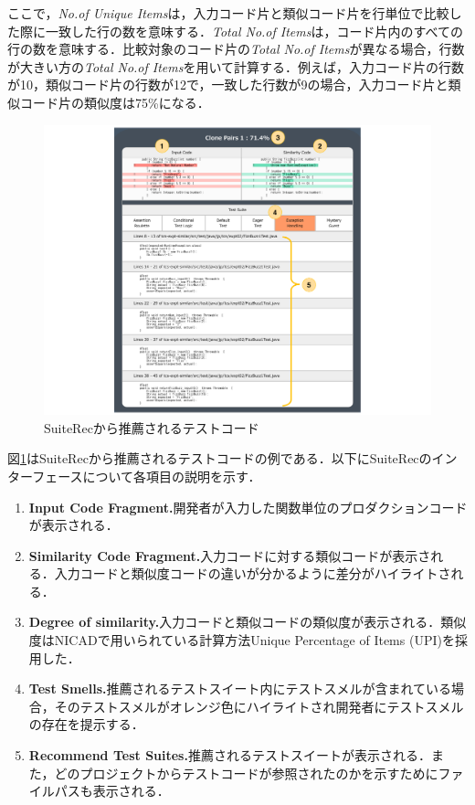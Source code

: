 \documentclass[12pt]{jarticle} %
\begin{document}
\vspace{\baselineskip}

ここで，{\it No.of Unique Items}は，入力コード片と類似コード片を行単位で比較した際に一致した行の数を意味する．{\it Total No.of Items}は，コード片内のすべての行の数を意味する．比較対象のコード片の{\it Total No.of Items}が異なる場合，行数が大きい方の{\it Total No.of Items}を用いて計算する．例えば，入力コード片の行数が10，類似コード片の行数が12で，一致した行数が9の場合，入力コード片と類似コード片の類似度は75\%になる．

\begin{figure}[htbp]
  \begin{center}
    \includegraphics[clip,width=15cm]{SuiteRec.pdf}
    \caption{SuiteRecから推薦されるテストコード}
    \label{SR}
  \end{center}
\end{figure}

\newpage
図\ref{SR}は{\sf SuiteRec}から推薦されるテストコードの例である．以下に{\sf SuiteRec}のインターフェースについて各項目の説明を示す．


\begin{enumerate}
\renewcommand{\labelenumi}{(\arabic{enumi})}
\item{\textbf{Input Code Fragment.}開発者が入力した関数単位のプロダクションコードが表示される．}
\item{\textbf{Similarity Code Fragment.}入力コードに対する類似コードが表示される．入力コードと類似度コードの違いが分かるように差分がハイライトされる．}
\item{\textbf{Degree of similarity.}入力コードと類似コードの類似度が表示される．類似度はNICADで用いられている計算方法Unique Percentage of Items (UPI)を採用した．}
\item{\textbf{Test Smells.}推薦されるテストスイート内にテストスメルが含まれている場合，そのテストスメルがオレンジ色にハイライトされ開発者にテストスメルの存在を提示する．}
\item{\textbf{Recommend Test Suites.}推薦されるテストスイートが表示される．また，どのプロジェクトからテストコードが参照されたのかを示すためにファイルパスも表示される．}
\end{enumerate}
\end{document}
